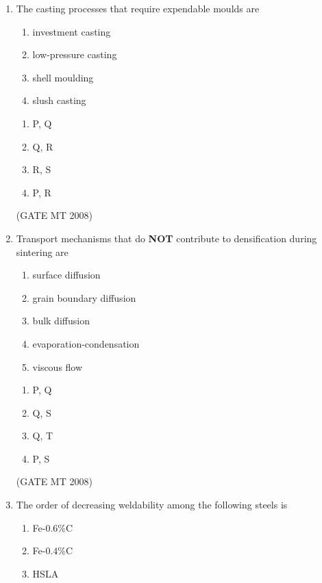 \documentclass[11pt, letterpaper]{article}
\theoremstyle{remark}
\begin{document}
\begin{enumerate}[label=Q.\arabic*]
\item The casting processes that require expendable moulds are
    \begin{multicols}{1}
        \begin{enumerate}[label=(\MakeUppercase{\alph*}), start= 16]
            \item investment casting
            \item low-pressure casting
            \item shell moulding
            \item slush casting
        \end{enumerate}
    \end{multicols}

    \begin{multicols}{2}
        \begin{enumerate}[label=(\MakeUppercase{\alph*})]
            \item P, Q
            \item Q, R
            \item R, S
            \item P, R
        \end{enumerate}
    \end{multicols}
\hfill(GATE MT 2008)
    \item Transport mechanisms that do \textbf{NOT} contribute to densification during sintering are
        \begin{enumerate}[label=(\MakeUppercase{\alph*}), start= 16]
            \item surface diffusion
            \item grain boundary diffusion
            \item bulk diffusion
            \item evaporation-condensation
            \item viscous flow
        \end{enumerate}

    \begin{multicols}{2}
        \begin{enumerate}[label=(\MakeUppercase{\alph*})]
            \item P, Q
            \item Q, S
            \item Q, T
            \item P, S
        \end{enumerate}
    \end{multicols}
\hfill(GATE MT 2008)
    \item The order of decreasing weldability among the following steels is
        \begin{enumerate}[label=(\MakeUppercase{\alph*}), start= 16]
            \item Fe-$0.6$\%C
            \item Fe-$0.4$\%C
            \item HSLA
        \end{enumerate}


\end{enumerate}
\end{document}
